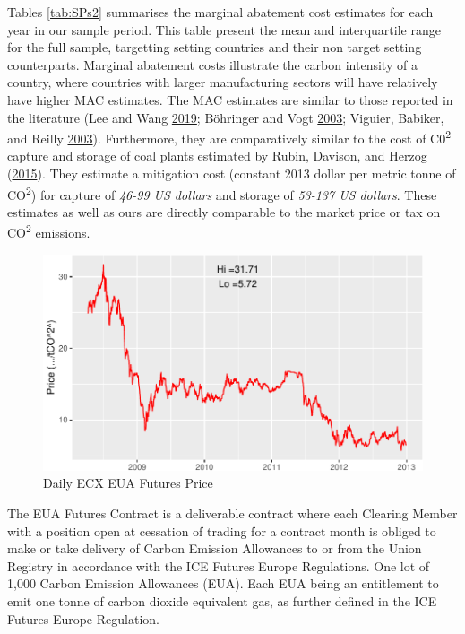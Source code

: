 \documentclass[
  12pt,
]{article}
\begin{document}
Tables \ref{tab:SPs2} summarises the marginal abatement cost estimates for each year in our sample period. This table present the mean and interquartile range for the full sample, targetting setting countries and their non target setting counterparts. Marginal abatement costs illustrate the carbon intensity of a country, where countries with larger manufacturing sectors will have relatively have higher MAC estimates. The MAC estimates are similar to those reported in the literature (Lee and Wang \protect\hyperlink{ref-Lee2019}{2019}; Böhringer and Vogt \protect\hyperlink{ref-Bohringer2003}{2003}; Viguier, Babiker, and Reilly \protect\hyperlink{ref-Viguier2003}{2003}). Furthermore, they are comparatively similar to the cost of C0\textsuperscript{2} capture and storage of coal plants estimated by Rubin, Davison, and Herzog (\protect\hyperlink{ref-Rubin2015}{2015}). They estimate a mitigation cost (constant 2013 dollar per metric tonne of CO\textsuperscript{2}) for capture of \emph{46-99 US dollars} and storage of \emph{53-137 US dollars}. These estimates as well as ours are directly comparable to the market price or tax on CO\textsuperscript{2} emissions.

\begin{figure}[H]

{\centering \includegraphics[width=0.7\linewidth]{lurking_co2_files/figure-latex/ETSprice-1} 

}

\caption{Daily ECX EUA Futures Price}\label{fig:ETSprice}
\end{figure}

\begin{footnotesize} The EUA Futures Contract is a deliverable contract where each Clearing Member with a position open at cessation of trading for a contract month is obliged to make or take delivery of Carbon Emission Allowances to or from the Union Registry in accordance with the ICE Futures Europe Regulations. One lot of 1,000 Carbon Emission Allowances (EUA). Each EUA being an entitlement to emit one tonne of carbon dioxide equivalent gas, as further defined in the ICE Futures Europe Regulation.
\end{footnotesize}
\end{document}
